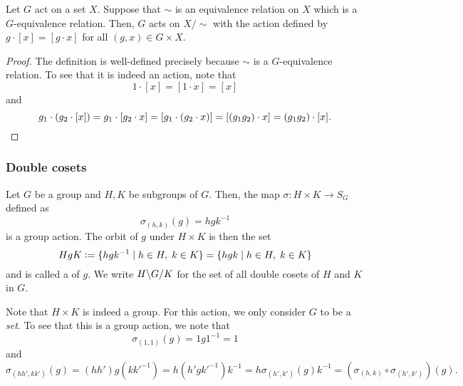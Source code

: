 \begin{prop} \label{prop:leftcongruence}
	Let $G$ act on a set $X.$ Suppose that $\sim$ is an equivalence relation on $X$ which is a $G$-equivalence relation. Then, $G$ acts on $X/{\sim}$ with the action defined by $g \cdot [x] = [g \cdot x]$ for all $(g, x) \in G \times X.$
\end{prop}
\begin{proof} 
	The definition is well-defined precisely because $\sim$ is a $G$-equivalence relation. To see that it is indeed an action, note that 
	\begin{equation*} 
		1 \cdot [x] = [1 \cdot x] = [x]
	\end{equation*}
	and
	\begin{equation*} 
		g_1 \cdot (g_2 \cdot [x]) = g_1 \cdot [g_2 \cdot x] = [g_1 \cdot (g_2 \cdot x)] = [(g_1 g_2) \cdot x] = (g_1 g_2) \cdot [x]. \qedhere
	\end{equation*}
\end{proof}

\subsubsection{Double cosets} \label{subsubsec:doublecosets}

\begin{defn}%
	\label{defn:doublecosets}
	Let $G$ be a group and $H, K$ be subgroups of $G.$ Then, the map $\sigma : H \times K \to S_G$ defined as
	\begin{equation*} 
		\sigma_{(h, k)}(g) = hgk^{-1}
	\end{equation*}
	is a group action. The orbit of $g$ under $H \times K$ is then the set
	\begin{equation*} 
		HgK \vcentcolon= \{hgk^{-1} \mid h \in H,\; k \in K\} = \{hgk \mid h \in H,\; k \in K\}
	\end{equation*}
	and is called a  of $g.$ We write $\dcos{H}{G}{K}$ for the set of all double cosets of $H$ and $K$ in $G.$
\end{defn}

\begin{rem}
	Note that $H \times K$ is indeed a group. For this action, we only consider $G$ to be a \emph{set}. To see that this is a group action, we note that
	\begin{equation*} 
		\sigma_{(1, 1)}(g) = 1g1^{-1} = 1
	\end{equation*}
	and
	\begin{equation*} 
		\sigma_{(hh', kk')}(g) = (hh')g(kk'^{-1}) = h(h'gk'^{-1})k^{-1} = h\sigma_{(h', k')}(g)k^{-1} = \left(\sigma_{(h, k)} \circ \sigma_{(h', k')}\right)(g).
	\end{equation*}
\end{rem}

